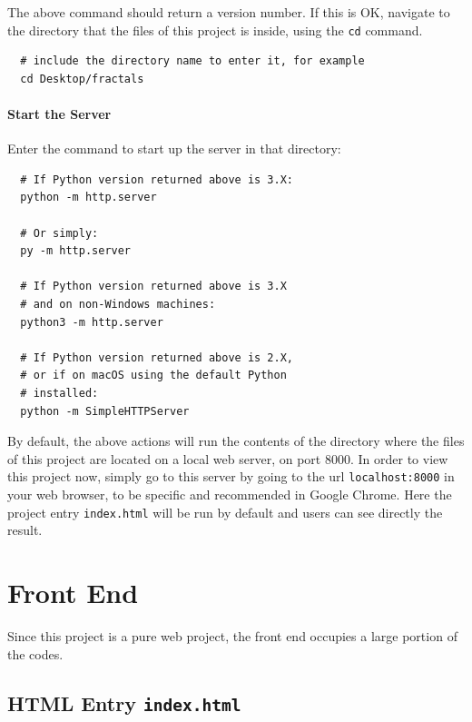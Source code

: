 The above command should return a version number. If this is OK, navigate to the directory that the files of this project is inside, using the \texttt{cd} command.

\begin{verbatim}
  # include the directory name to enter it, for example
  cd Desktop/fractals
\end{verbatim}

\paragraph{Start the Server}

Enter the command to start up the server in that directory:

\begin{verbatim}
  # If Python version returned above is 3.X:
  python -m http.server
  
  # Or simply:
  py -m http.server

  # If Python version returned above is 3.X
  # and on non-Windows machines:
  python3 -m http.server

  # If Python version returned above is 2.X,
  # or if on macOS using the default Python
  # installed:
  python -m SimpleHTTPServer
\end{verbatim}

By default, the above actions will run the contents of the directory where the files of this project are located on a local web server, on port $8000$. In order to view this project now, simply go to this server by going to the \gls{url} \texttt{localhost:8000} in your web browser, to be specific and recommended in Google Chrome. Here the project entry \texttt{index.html} will be run by default and users can see directly the result.


\section{Front End}

Since this project is a pure web project, the front end occupies a large portion of the codes.

\subsection{HTML Entry \texttt{index.html}}

